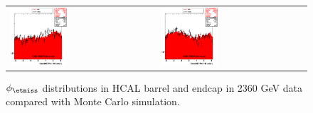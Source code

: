 \begin{figure}[h!]
 \centering
 \begin{tabular}{ll}
  \includegraphics[width=0.40\textwidth]{plots_DataVsMC_MB_2360GeV/my_calometHBPhi.eps} &
  \includegraphics[width=0.40\textwidth]{plots_DataVsMC_MB_2360GeV/my_calometHEPhi.eps} \\
 \end{tabular}
 \caption{$\phi_{\etmiss}$ distributions in HCAL barrel and endcap in 2360 GeV data compared
   with Monte Carlo simulation.
          \label{fig:DataVsMC_MB_2360_9}}
\end{figure}

